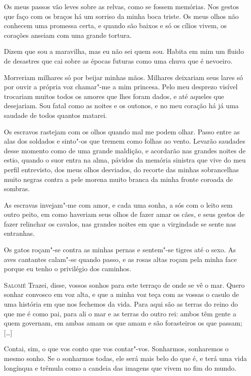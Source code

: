 Os meus passos vão leves sobre as relvas, como se fossem memórias. Nos
gestos que faço com os braços há um sorriso da minha boca triste. Os
meus olhos não conhecem uma promessa certa, e quando são baixos e só
os cílios vivem, os corações anseiam com uma grande tortura. 

Dizem que sou a maravilha, mas eu não sei quem sou. Habita em mim um
fluido de desastres que cai sobre as épocas futuras como uma chuva
que é nevoeiro. 

Morreriam milhares só por beijar minhas mãos. Milhares deixariam seus
lares só por ouvir a própria voz chamar"-me a mim princesa. Pelo meu
desprezo visível trocariam muitos todos os amores que lhes foram
dados, e até aqueles que desejariam. Sou fatal como as noites e os
outonos, e no meu coração há já uma saudade de todos quantos matarei.


Os escravos rastejam com os olhos quando mal me podem olhar. Passo
entre as alas dos soldados e sinto"-os que tremem como folhas ao
vento. Levarão saudades desse momento como de uma grande maldição, e
acordarão nas grandes noites de estio, quando o suor entra na alma,
pávidos da memória sinistra que vive do meu perfil entrevisto, dos
meus olhos desviados, do recorte das minhas sobrancelhas muito negras
contra a pele morena muito branca da minha fronte coroada de sombras.

As escravas invejam"-me com amor, e cada uma sonha, a sós com o leito
sem outro peito, em como haveriam seus olhos de fazer amar os cães, e
seus gestos de fazer relinchar os cavalos, nas grandes noites em que
a virgindade se sente nas entranhas.

Os gatos roçam"-se contra as minhas pernas e sentem"-se tigres até o
sexo. As aves cantantes calam"-se quando passo, e as rosas altas roçam
pela minha face porque eu tenho o privilégio dos caminhos.

\textsc{Salomé} Trazei, disse, vossos sonhos para este terraço de onde se
vê o mar. Quero sonhar convosco em voz alta, e que a minha voz teça
com as vossas o casulo de uma história em que nos fechemos da vida.
Para aqui são as terras do reino do que me é como pai, para ali o mar
e as terras do outro rei: ambos têm gente a quem governam, em ambas
amam os que amam e são forasteiros os que passam; [\ldots{}]

Contai, sim, o que vos conto que vos contar"-vos. Sonharmos, sonharemos
o mesmo sonho. Se o sonharmos todas, ele será mais belo do que é, e
terá uma vida longínqua e trêmula como a candeia das imagens que
vivem no fim do mundo.

